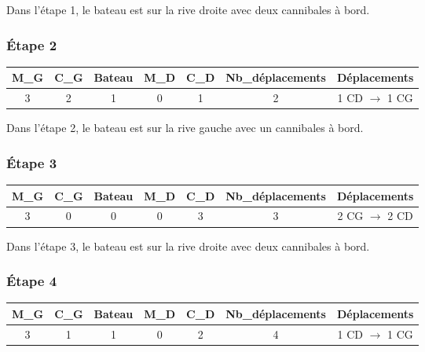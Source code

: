 \documentclass{article}
\begin{document}
\noindent Dans l'étape 1, le bateau est sur la rive droite avec deux cannibales à bord.

\subsubsection{Étape 2}

\begin{center}
\begin{tabular}{|c|c|c|c|c|c|c|}
\hline
\textbf{M\_G} & \textbf{C\_G} & \textbf{Bateau} & \textbf{M\_D} & \textbf{C\_D} & \textbf{Nb\_déplacements} & \textbf{Déplacements} \\
\hline
3 & 2 & 1 & 0 & 1 & 2 & 1 CD $\rightarrow$ 1 CG \\
\hline
\end{tabular}
\end{center}

\noindent Dans l'étape 2, le bateau est sur la rive gauche avec un cannibales à bord.

\subsubsection{Étape 3}

\begin{center}
\begin{tabular}{|c|c|c|c|c|c|c|}
\hline
\textbf{M\_G} & \textbf{C\_G} & \textbf{Bateau} & \textbf{M\_D} & \textbf{C\_D} & \textbf{Nb\_déplacements} & \textbf{Déplacements} \\
\hline
3 & 0 & 0 & 0 & 3 & 3 & 2 CG $\rightarrow$ 2 CD \\
\hline
\end{tabular}
\end{center}

\noindent Dans l'étape 3, le bateau est sur la rive droite avec deux cannibales à bord.

\subsubsection{Étape 4}

\begin{center}
\begin{tabular}{|c|c|c|c|c|c|c|}
\hline
\textbf{M\_G} & \textbf{C\_G} & \textbf{Bateau} & \textbf{M\_D} & \textbf{C\_D} & \textbf{Nb\_déplacements} & \textbf{Déplacements} \\
\hline
3 & 1 & 1 & 0 & 2 & 4 & 1 CD $\rightarrow$ 1 CG \\
\hline
\end{tabular}
\end{center}
\end{document}
